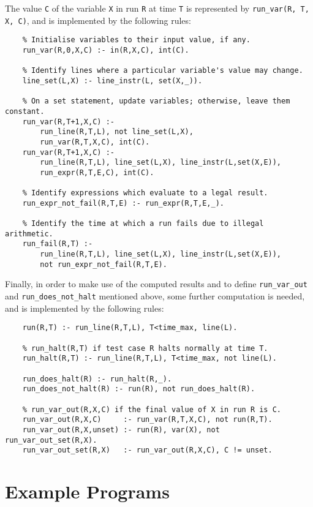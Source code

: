 \documentclass[a4paper,twoside,notitlepage]{report}
\begin{document}
The value \verb|C| of the variable \verb|X| in run \verb|R| at time 
\verb|T| is represented by \verb|run_var(R, T, X, C)|, and is implemented 
by the following rules:
\begin{Verbatim}
    % Initialise variables to their input value, if any.
    run_var(R,0,X,C) :- in(R,X,C), int(C).
    
    % Identify lines where a particular variable's value may change.
    line_set(L,X) :- line_instr(L, set(X,_)).
    
    % On a set statement, update variables; otherwise, leave them constant.
    run_var(R,T+1,X,C) :-
        run_line(R,T,L), not line_set(L,X),
        run_var(R,T,X,C), int(C).
    run_var(R,T+1,X,C) :-
        run_line(R,T,L), line_set(L,X), line_instr(L,set(X,E)),
        run_expr(R,T,E,C), int(C).
    
    % Identify expressions which evaluate to a legal result.
    run_expr_not_fail(R,T,E) :- run_expr(R,T,E,_).
    
    % Identify the time at which a run fails due to illegal arithmetic.
    run_fail(R,T) :-
        run_line(R,T,L), line_set(L,X), line_instr(L,set(X,E)),
        not run_expr_not_fail(R,T,E).
\end{Verbatim}

Finally, in order to make use of the computed results and to define 
\verb|run_var_out| and \verb|run_does_not_halt| mentioned above, some 
further computation is needed, and is implemented by the following rules:

\begin{Verbatim}[samepage=true]
    % run(R,T) if test case R runs to at least time T.
    run(R,T) :- run_line(R,T,L), T<time_max, line(L).
    
    % run_halt(R,T) if test case R halts normally at time T.
    run_halt(R,T) :- run_line(R,T,L), T<time_max, not line(L).
    
    run_does_halt(R) :- run_halt(R,_).
    run_does_not_halt(R) :- run(R), not run_does_halt(R).
    
    % run_var_out(R,X,C) if the final value of X in run R is C.
    run_var_out(R,X,C)     :- run_var(R,T,X,C), not run(R,T).
    run_var_out(R,X,unset) :- run(R), var(X), not run_var_out_set(R,X).
    run_var_out_set(R,X)   :- run_var_out(R,X,C), C != unset.
\end{Verbatim}

\section{Example Programs} \label{sec:synexm_progs}
\end{document}
